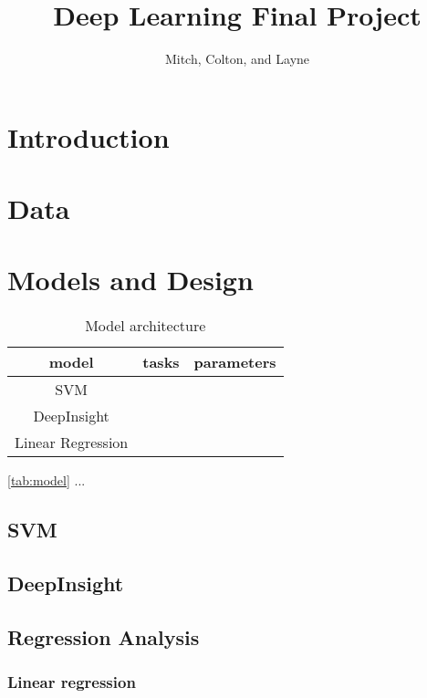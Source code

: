 \documentclass[12pt,letterpaper]{article}
\title{Deep Learning Final Project}
\author{Mitch, Colton, and Layne}
\date{}
\begin{document}
\maketitle

\section{Introduction}

\section{Data}

\section{Models and Design}

\begin{table}[ht]
\centering
\begin{tabular}{|c|c|c|}
\hline
model & tasks & parameters \\
\hline
SVM &  &  \\
\hline
DeepInsight &  &  \\
\hline
Linear Regression &  &  \\
\hline
\end{tabular}

\label{tab:model}
\caption{Model architecture}

\end{table}

\autoref{tab:model} ...



\subsection{SVM}
%

\subsection{DeepInsight}
%

\subsection{Regression Analysis}
\subsubsection{Linear regression}
%
\end{document}

